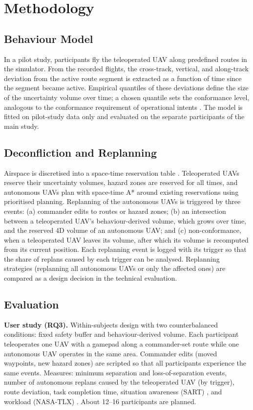\documentclass{article}
\begin{document}
\section{Methodology}

\subsection{Behaviour Model}
In a pilot study, participants fly the teleoperated UAV along predefined routes in the simulator.
From the recorded flights, the cross-track, vertical, and along-track deviation from the active route segment is extracted as a function of time since the segment became active.
Empirical quantiles of these deviations define the size of the uncertainty volume over time; a chosen quantile sets the conformance level, analogous to the conformance requirement of operational intents \cite{astmf3548}.
The model is fitted on pilot-study data only and evaluated on the separate participants of the main study.

\subsection{Deconfliction and Replanning}
Airspace is discretised into a space-time reservation table \cite{silver2005}.
Teleoperated UAVs reserve their uncertainty volumes, hazard zones are reserved for all times, and autonomous UAVs plan with space-time A* around existing reservations using prioritised planning.
Replanning of the autonomous UAVs is triggered by three events: (a) commander edits to routes or hazard zones; (b) an intersection between a teleoperated UAV's behaviour-derived volume, which grows over time, and the reserved 4D volume of an autonomous UAV; and (c) non-conformance, when a teleoperated UAV leaves its volume, after which its volume is recomputed from its current position.
Each replanning event is logged with its trigger so that the share of replans caused by each trigger can be analysed.
Replanning strategies (replanning all autonomous UAVs or only the affected ones) are compared as a design decision in the technical evaluation.

\subsection{Evaluation}
\textbf{User study (RQ3).} Within-subjects design with two counterbalanced conditions: fixed safety buffer and behaviour-derived volume.
Each participant teleoperates one UAV with a gamepad along a commander-set route while one autonomous UAV operates in the same area.
Commander edits (moved waypoints, new hazard zones) are scripted so that all participants experience the same events.
Measures: minimum separation and loss-of-separation events, number of autonomous replans caused by the teleoperated UAV (by trigger), route deviation, task completion time, situation awareness (SART) \cite{taylor1990}, and workload (NASA-TLX) \cite{hart1988}.
About 12--16 participants are planned.
\end{document}
